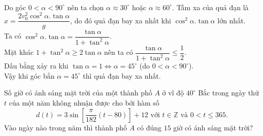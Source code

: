 \begin{ex}
{\begin{itemchoice}
\begin{eqnarray*}
			\end{eqnarray*} Do góc $0<\alpha<90^\circ$ nên ta chọn $\alpha\approx 30^\circ$ hoặc $\alpha\approx 60^\circ$.
			\itemch Tầm  xa của quả đạn  là $x=\dfrac{2 v_0^2 \cos ^2 \alpha.\tan \alpha}{g}$, do đó quả đạn bay xa nhất khi $ \cos ^2 \alpha.\tan \alpha$ lớn nhất.\\
			Ta có $\cos ^2 \alpha.\tan \alpha =\dfrac{\tan \alpha}{1+\tan^2\alpha}$.\\ Mặt khác $1+\tan^2\alpha \ge 2\tan\alpha$  nên ta có $\dfrac{\tan \alpha}{1+\tan^2\alpha} \le \dfrac{1}{2}$.\\  Dấu bằng xảy ra khi $\tan\alpha =1 \Leftrightarrow \alpha=45^\circ $ (do $0<\alpha<90^\circ$). \\
			Vậy khi góc bắn $\alpha=45^\circ$ thì quả đạn bay xa nhất.
		\end{itemchoice}
	}
\end{ex}

\begin{bt}%
	Số giờ có ánh sáng mặt trời của một thành phố $A$ ở vĩ độ $40^\circ$ Bắc trong ngày thứ $t$ của một năm không nhuận được cho bởi hàm số
	\[
	d(t)=3\sin \left[\dfrac{\pi}{182}(t-80)\right] +12 \text{ với } t\in \mathbb{Z} \text{ và } 0<t\leq 365.
	\]
	Vào ngày nào trong năm thì thành phố $A$ có đúng $15$ giờ có ánh sáng mặt trời?
\end{bt}

